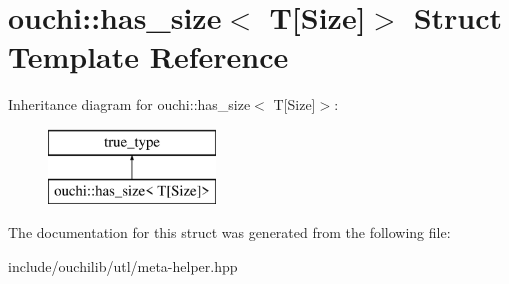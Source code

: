 \hypertarget{structouchi_1_1has__size_3_01_t[_size]_4}{}\section{ouchi\+::has\+\_\+size$<$ T\mbox{[}Size\mbox{]}$>$ Struct Template Reference}
\label{structouchi_1_1has__size_3_01_t[_size]_4}
Inheritance diagram for ouchi\+::has\+\_\+size$<$ T\mbox{[}Size\mbox{]}$>$\+:\begin{figure}[H]
\begin{center}
\leavevmode
\includegraphics[height=2.000000cm]{structouchi_1_1has__size_3_01_t[_size]_4}
\end{center}
\end{figure}


The documentation for this struct was generated from the following file\+:\begin{DoxyCompactItemize}
\item 
include/ouchilib/utl/meta-\/helper.\+hpp\end{DoxyCompactItemize}
